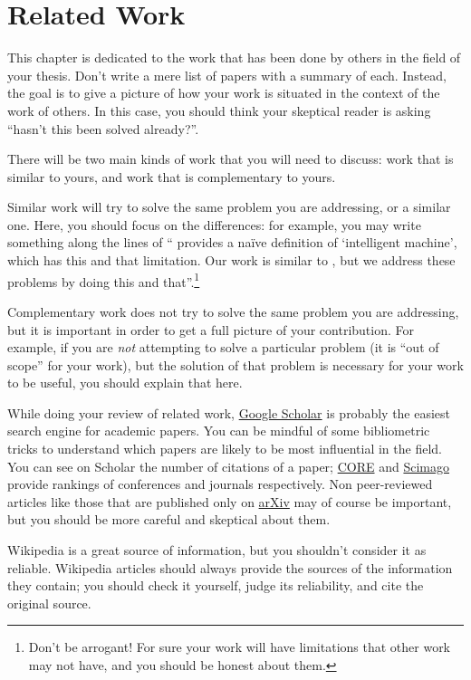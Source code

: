 \chapter{Related Work}
\label{sec:related}

This chapter is dedicated to the work that has been done by others in the field of your thesis.
Don't write a mere list of papers with a summary of each. Instead, the goal is to give a picture
of how your work is situated in the context of the work of others. In this case, you should
think your skeptical reader is asking ``hasn't this been solved already?''.

There will be two main kinds of work that you will need to discuss: work that is similar
to yours, and work that is complementary to yours.

Similar work will try to solve the same problem you are addressing, or a similar one.
Here, you should focus on the differences: for example, you may write something along the
lines of ``\textcite{DBLP:journals/x/Turing50} provides a naïve definition of
`intelligent machine', which has this and that limitation. Our work is similar to
\citeauthor{DBLP:journals/x/Turing50}, but we address these problems by doing this and
that''.\footnote{Don't be arrogant! For sure your work will have limitations that other work
may not have, and you should be honest about them.}

Complementary work does not try to solve the same problem you are addressing, but it is
important in order to get a full picture of your contribution. For example, if you are
\emph{not} attempting to solve a particular problem (it is ``out of scope'' for your work),
but the solution of that problem is necessary for your work to be useful, you should explain
that here.

While doing your review of related work, \href{https://scholar.google.com}{Google Scholar}
is probably the easiest search engine for academic papers. You can be mindful of some
bibliometric tricks to understand which papers are likely to be most influential in the field.
You can see on Scholar the number of citations of a paper;
\href{https://portal.core.edu.au/conf-ranks/}{CORE} and
\href{https://www.scimagojr.com}{Scimago} provide rankings of conferences and journals
respectively. Non peer-reviewed articles like those that are published only on
\href{https://arxiv.org}{arXiv} may of course be important, but you should be more careful
and skeptical about them.

Wikipedia is a great source of information, but you shouldn't consider it as reliable.
Wikipedia articles should always provide the sources of the information they contain; you
should check it yourself, judge its reliability, and cite the original source.

